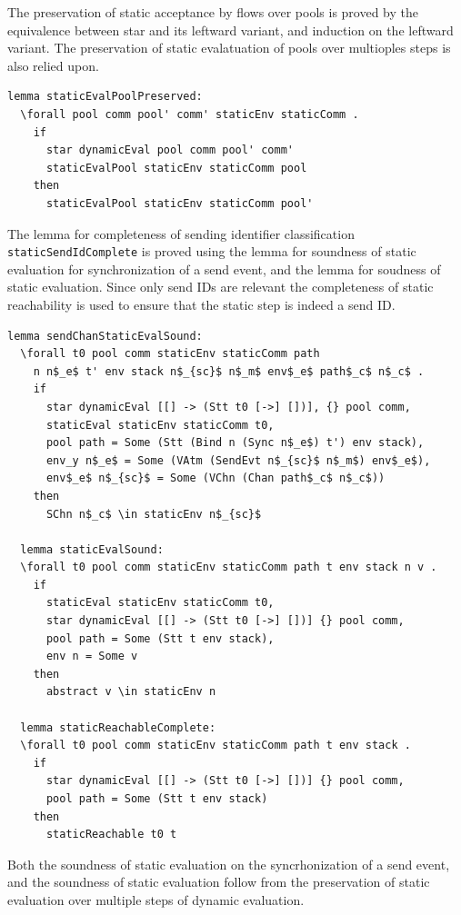 \documentclass[10pt]{article}
\begin{document}
The preservation of static acceptance by flows over pools is proved by the
equivalence between star and its leftward variant, and induction on the leftward variant.
The preservation of static evalatuation of pools over multioples steps is also relied upon.

\begin{lstlisting}[language=logic, mathescape]
  lemma staticEvalPoolPreserved:
  \forall pool comm pool' comm' staticEnv staticComm .
    if
      star dynamicEval pool comm pool' comm' 
      staticEvalPool staticEnv staticComm pool
    then
      staticEvalPool staticEnv staticComm pool'
\end{lstlisting}

The lemma for completeness of sending identifier classification \lstinline{staticSendIdComplete}
is proved using the lemma for
soundness of static evaluation for synchronization of a send event,
and the lemma for soudness of static evaluation.
Since only send IDs are relevant the completeness of static reachability is
used to ensure that the static step is indeed a send ID. 

\begin{lstlisting}[language=logic, mathescape]
  lemma sendChanStaticEvalSound:
  \forall t0 pool comm staticEnv staticComm path
    n n$_e$ t' env stack n$_{sc}$ n$_m$ env$_e$ path$_c$ n$_c$ .
    if
      star dynamicEval [[] -> (Stt t0 [->] [])], {} pool comm,
      staticEval staticEnv staticComm t0,
      pool path = Some (Stt (Bind n (Sync n$_e$) t') env stack),
      env_y n$_e$ = Some (VAtm (SendEvt n$_{sc}$ n$_m$) env$_e$),
      env$_e$ n$_{sc}$ = Some (VChn (Chan path$_c$ n$_c$))
    then
      SChn n$_c$ \in staticEnv n$_{sc}$

  lemma staticEvalSound:
  \forall t0 pool comm staticEnv staticComm path t env stack n v .
    if
      staticEval staticEnv staticComm t0, 
      star dynamicEval [[] -> (Stt t0 [->] [])] {} pool comm,
      pool path = Some (Stt t env stack), 
      env n = Some v
    then
      abstract v \in staticEnv n 

  lemma staticReachableComplete:
  \forall t0 pool comm staticEnv staticComm path t env stack .
    if
      star dynamicEval [[] -> (Stt t0 [->] [])] {} pool comm,
      pool path = Some (Stt t env stack)
    then
      staticReachable t0 t 
\end{lstlisting}

Both the soundness of static evaluation on the syncrhonization of a send event,
and the soundness of static evaluation follow from
the preservation of static evaluation over multiple steps of dynamic evaluation.
\end{document}

